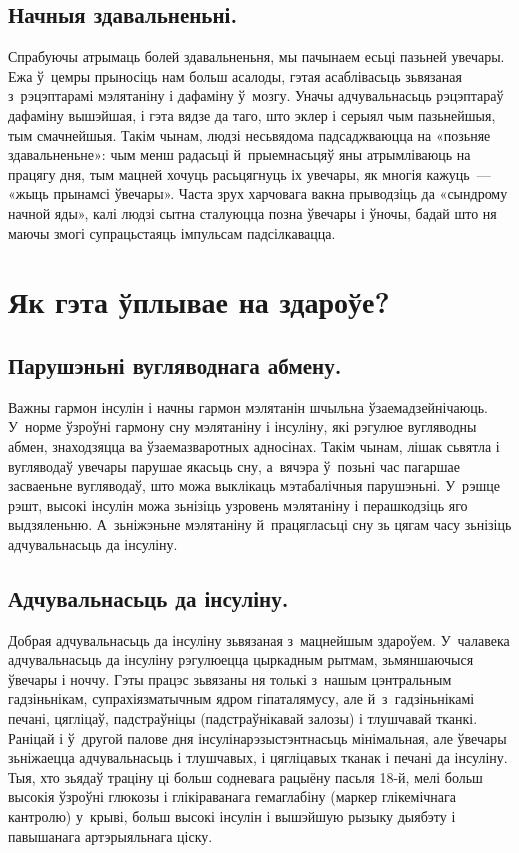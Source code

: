\subsection{Начныя здавальненьні.}
Спрабуючы атрымаць болей здавальненьня, мы пачынаем есьці пазьней увечары. Ежа ў~цемры прыносіць нам больш асалоды, гэтая асаблівасьць зьвязаная з~рэцэптарамі мэлятаніну і дафаміну ў~мозгу. Уначы адчувальнасьць рэцэптараў дафаміну вышэйшая, і гэта вядзе да таго, што эклер і серыял чым пазьнейшыя, тым смачнейшыя. Такім чынам, людзі несьвядома падсаджваюцца на «позьняе здавальненьне»: чым менш радасьці й~прыемнасьцяў яны атрымліваюць на працягу дня, тым мацней хочуць расьцягнуць іх увечары, як многія кажуць~--- «жыць прынамсі ўвечары». Часта зрух харчовага вакна прыводзіць да «сындрому начной яды», калі людзі сытна сталуюцца позна ўвечары і ўночы, бадай што ня маючы змогі супрацьстаяць імпульсам падсілкавацца.

\section{Як гэта ўплывае на здароўе?}

\subsection{Парушэньні вугляводнага абмену.}
Важны гармон інсулін і начны гармон мэлятанін шчыльна ўзаемадзейнічаюць. У~норме ўзроўні гармону сну мэлятаніну і інсуліну, які рэгулюе вугляводны абмен, знаходзяцца ва ўзаемазваротных адносінах. Такім чынам, лішак сьвятла і вугляводаў увечары парушае якасьць сну, а~вячэра ў~позьні час пагаршае засваеньне вугляводаў, што можа выклікаць мэтабалічныя парушэньні. У~рэшце рэшт, высокі інсулін можа зьнізіць узровень мэлятаніну і перашкодзіць яго выдзяленьню. А~зьніжэньне мэлятаніну й~працягласьці сну зь цягам часу зьнізіць адчувальнасьць да інсуліну.

\subsection{Адчувальнасьць да інсуліну.}
Добрая адчувальнасьць да інсуліну зьвязаная з~мацнейшым здароўем. У~чалавека адчувальнасьць да інсуліну рэгулюецца цыркадным рытмам, зьмяншаючыся ўвечары і ноччу. Гэты працэс зьвязаны ня толькі з~нашым цэнтральным гадзіньнікам, супрахіязматычным ядром гіпаталямусу, але й~з~гадзіньнікамі печані, цягліцаў, падстраўніцы (падстраўнікавай залозы) і тлушчавай тканкі. Раніцай і ў~другой палове дня інсулінарэзыстэнтнасьць мінімальная, але ўвечары зьніжаецца адчувальнасьць і тлушчавых, і цягліцавых тканак і печані да інсуліну. Тыя, хто зьядаў траціну ці больш содневага рацыёну пасьля 18-й, мелі больш высокія ўзроўні глюкозы і глікіраванага гемаглабіну (маркер глікемічнага кантролю) у~крыві, больш высокі інсулін і вышэйшую рызыку дыябэту і павышанага артэрыяльнага ціску.

